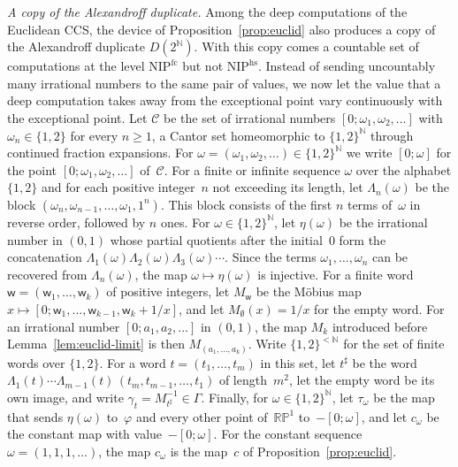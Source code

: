 \documentclass[psamsfonts]{amsart}
\theoremstyle{definition}
\theoremstyle{remark}
\newcommand{\NIP}{\text{NIP}}
\newcommand{\RP}{\mathbb{R}\mathbb{P}}
\numberwithin{equation}{section}
\begin{document}
\emph{A copy of the Alexandroff duplicate.}
Among the deep computations of the Euclidean CCS, the device of Proposition~\ref{prop:euclid} also produces a copy of the Alexandroff duplicate $D(2^{\mathbb{N}})$.
With this copy comes a countable set of computations at the level $\NIP^{\mathrm{fc}}$ but not $\NIP^{\mathrm{hs}}$.
Instead of sending uncountably many irrational numbers to the same pair of values, we now let the value that a deep computation takes away from the exceptional point vary continuously with the exceptional point.
Let $\mathcal{C}$ be the set of irrational numbers $[0;\omega_1,\omega_2,\dots]$ with $\omega_n\in\{1,2\}$ for every $n\ge1$, a Cantor set homeomorphic to $\{1,2\}^{\mathbb{N}}$ through continued fraction expansions.
For $\omega=(\omega_1,\omega_2,\dots)\in\{1,2\}^{\mathbb{N}}$ we write $[0;\omega]$ for the point $[0;\omega_1,\omega_2,\dots]$ of~$\mathcal{C}$.
For a finite or infinite sequence $\omega$ over the alphabet $\{1,2\}$ and for each positive integer~$n$ not exceeding its length, let $\Lambda_n(\omega)$ be the block $(\omega_n,\omega_{n-1},\dots,\omega_1,1^n)$.
This block consists of the first $n$ terms of~$\omega$ in reverse order, followed by $n$ ones.
For $\omega\in\{1,2\}^{\mathbb{N}}$, let $\eta(\omega)$ be the irrational number in $(0,1)$ whose partial quotients after the initial~$0$ form the concatenation $\Lambda_1(\omega)\Lambda_2(\omega)\Lambda_3(\omega)\cdots$.
Since the terms $\omega_1,\dots,\omega_n$ can be recovered from $\Lambda_n(\omega)$, the map $\omega\mapsto\eta(\omega)$ is injective.
For a finite word $\mathsf{w}=(\mathsf{w}_1,\dots,\mathsf{w}_k)$ of positive integers, let $M_{\mathsf{w}}$ be the Möbius map $x\mapsto[0;\mathsf{w}_1,\dots,\mathsf{w}_{k-1},\mathsf{w}_k+1/x]$, and let $M_{\emptyset}(x)=1/x$ for the empty word.
For an irrational number $[0;a_1,a_2,\dots]$ in $(0,1)$, the map $M_k$ introduced before Lemma~\ref{lem:euclid-limit} is then $M_{(a_1,\dots,a_k)}$.
Write $\{1,2\}^{<\mathbb{N}}$ for the set of finite words over $\{1,2\}$.
For a word $t=(t_1,\dots,t_m)$ in this set, let $t^\sharp$ be the word $\Lambda_1(t)\cdots\Lambda_{m-1}(t)\,(t_m,t_{m-1},\dots,t_1)$ of length~$m^2$, let the empty word be its own image, and write $\gamma_t=M_{t^\sharp}^{-1}\in\Gamma$.
Finally, for $\omega\in\{1,2\}^{\mathbb{N}}$, let $\tau_\omega$ be the map that sends $\eta(\omega)$ to~$\varphi$ and every other point of~$\RP^1$ to~$-[0;\omega]$, and let $c_\omega$ be the constant map with value~$-[0;\omega]$.
For the constant sequence $\omega=(1,1,1,\dots)$, the map $c_\omega$ is the map~$c$ of Proposition~\ref{prop:euclid}.
\end{document}
